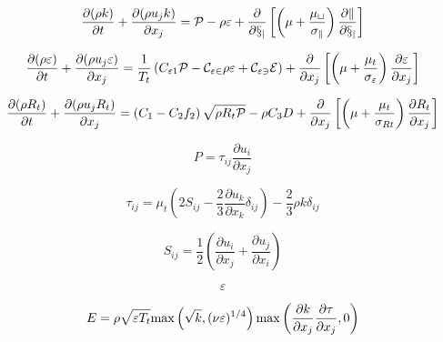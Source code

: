 

\begin{equation}
\frac{\partial (\rho k)}{\partial t} + \frac{\partial (\rho u_j k)}{\partial x_j}
  = \cal P - \rho \varepsilon  + \frac{\partial}{\partial x_j}
  \left[\left(\mu + \frac{\mu_t}{\sigma_k} \right)\frac{\partial k}{\partial x_j}\right]
\end{equation}

\begin{equation}
\frac{\partial (\rho \varepsilon)}{\partial t} + 
  \frac{\partial (\rho u_j \varepsilon)}{\partial x_j}
  = \frac{1}{T_t} \left( C_{\varepsilon 1} \cal P -
  C_{\varepsilon 2} \rho \varepsilon + 
  C_{\varepsilon 3} E \right) + \frac{\partial}{\partial x_j}
  \left[ \left( \mu + \frac{\mu_t}{\sigma_{\varepsilon}} \right)
  \frac{\partial \varepsilon}{\partial x_j} \right]
\end{equation}

\begin{equation}
\frac{\partial (\rho R_t)}{\partial t} +  \frac{\partial (\rho u_j R_t)}{\partial x_j}
  = \left( C_1 - C_2f_2 \right) \sqrt{\rho R_t \cal P}
  -\rho C_3 D + \frac{\partial}{\partial x_j}
  \left[ \left( \mu + \frac{\mu_t}{\sigma_{Rt}} \right)
  \frac{\partial R_t}{\partial x_j} \right]
\end{equation}

\begin{equation}
P = \tau_{ij} \frac{\partial u_i}{\partial x_j}
\end{equation}

\begin{equation}
\tau_{ij} = \mu_t \left(2S_{ij} - \frac{2}{3} \frac{\partial u_k}{\partial x_k} \delta_{ij} \right)
   - \frac{2}{3} \rho k \delta_{ij}
\end{equation}

\begin{equation}
S_{ij} = \frac{1}{2} \left( \frac{\partial u_i}{\partial x_j} + \frac{\partial u_j}{\partial x_i} \right)
\end{equation}

\begin{equation}
\varepsilon
\end{equation}

\begin{equation}
E = \rho \sqrt{\varepsilon T_t} {\rm max}\left( \sqrt{k}, (\nu \varepsilon)^{1/4} \right)
   {\rm max} \left( \frac{\partial k}{\partial x_j} 
   \frac{\partial \tau}{\partial x_j},0 \right)
\end{equation}

